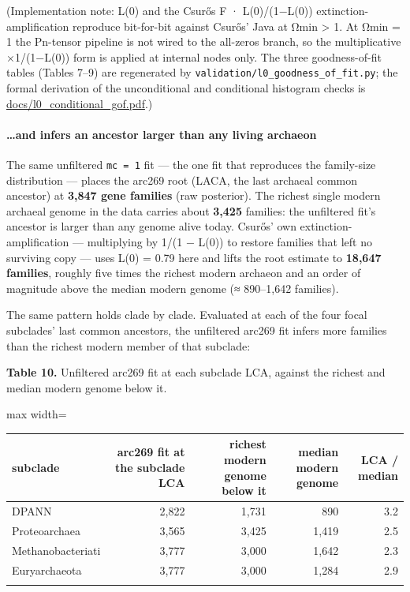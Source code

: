 \documentclass[
  10pt,
]{article}
\begin{document}
(Implementation note: L(0) and the Csurős F · L(0)/(1−L(0))
extinction-amplification reproduce bit-for-bit against Csurős' Java at
Ωmin \textgreater{} 1. At Ωmin = 1 the Pn-tensor pipeline is not wired
to the all-zeros branch, so the multiplicative ×1/(1−L(0)) form is
applied at internal nodes only. The three goodness-of-fit tables (Tables
7--9) are regenerated by \texttt{validation/l0\_goodness\_of\_fit.py};
the formal derivation of the unconditional and conditional histogram
checks is \url{docs/l0_conditional_gof.pdf}.)

\paragraph{\ldots and infers an ancestor larger than any living
archaeon}\label{and-infers-an-ancestor-larger-than-any-living-archaeon}

The same unfiltered \texttt{mc\ =\ 1} fit --- the one fit that
reproduces the family-size distribution --- places the arc269 root
(LACA, the last archaeal common ancestor) at \textbf{3,847 gene
families} (raw posterior). The richest single modern archaeal genome in
the data carries about \textbf{3,425} families: the unfiltered fit's
ancestor is larger than any genome alive today. Csurős' own
extinction-amplification --- multiplying by 1/(1 − L(0)) to restore
families that left no surviving copy --- uses L(0) = 0.79 here and lifts
the root estimate to \textbf{18,647 families}, roughly five times the
richest modern archaeon and an order of magnitude above the median
modern genome (≈ 890--1,642 families).

The same pattern holds clade by clade. Evaluated at each of the four
focal subclades' last common ancestors, the unfiltered arc269 fit infers
more families than the richest modern member of that subclade:

\textbf{Table 10.} Unfiltered arc269 fit at each subclade LCA, against
the richest and median modern genome below it.

\begin{center}
\begin{adjustbox}{max width=\textwidth}
\begin{tabular}{@{}lrrrr@{}}
\toprule\noalign{}
subclade & arc269 fit at the subclade LCA & richest modern genome below
it & median modern genome & LCA / median \\
\midrule\noalign{}
DPANN & 2,822 & 1,731 & 890 & 3.2 \\
Proteoarchaea & 3,565 & 3,425 & 1,419 & 2.5 \\
Methanobacteriati & 3,777 & 3,000 & 1,642 & 2.3 \\
Euryarchaeota & 3,777 & 3,000 & 1,284 & 2.9 \\
\bottomrule\noalign{}
\end{tabular}
\end{adjustbox}
\end{center}
\end{document}
